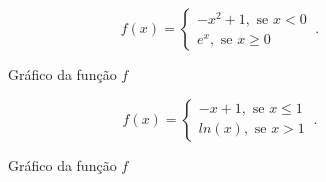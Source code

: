 \begin{exem}
\begin{equation}
f(x) = \begin{cases}
                 -x^2 + 1, \text{ se } x < 0 \\
                 e^x, \text{ se } x \geqslant 0
                \end{cases} \ .
\end{equation}
   \begin{figure}[H]
  \centering
   \caption{Gráfico da função $f$}
  \end{figure}
\end{exem}

\begin{exem}
\begin{equation}
f(x) = \begin{cases}
                 -x + 1, \text{ se } x \leqslant 1 \\
                 ln(x), \text{ se } x > 1
                \end{cases} \ .
\end{equation}
\begin{figure}[H]
  \centering
   \caption{Gráfico da função $f$}
  \end{figure}
\end{exem}

